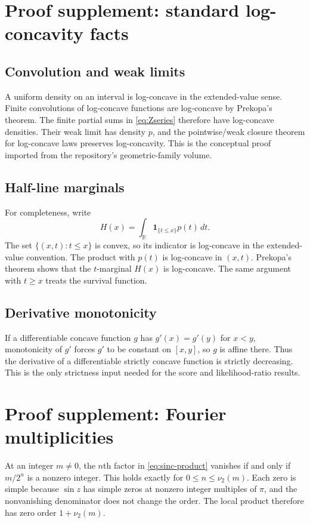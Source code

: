 \documentclass[11pt,oneside]{article}
\theoremstyle{definition}
\theoremstyle{remark}
\newcommand{\R}{\mathbb R}
\begin{document}
\appendix

\section{Proof supplement: standard log-concavity facts}

\subsection{Convolution and weak limits}
A uniform density on an interval is log-concave in the extended-value sense.
Finite convolutions of log-concave functions are log-concave by Prekopa's theorem.
The finite partial sums in \eqref{eq:Zseries} therefore have log-concave densities.
Their weak limit has density $p$, and the pointwise/weak closure theorem for
log-concave laws preserves log-concavity.  This is the conceptual proof imported
from the repository's geometric-family volume.

\subsection{Half-line marginals}
For completeness, write
\[
 H(x)=\int_{\R}\mathbf 1_{\{t\le x\}}p(t)\,dt.
\]
The set $\{(x,t):t\le x\}$ is convex, so its indicator is log-concave in the
extended-value convention.  The product with $p(t)$ is log-concave in $(x,t)$.
Prekopa's theorem shows that the $t$-marginal $H(x)$ is log-concave.  The same
argument with $t\ge x$ treats the survival function.

\subsection{Derivative monotonicity}
If a differentiable concave function $g$ has $g'(x)=g'(y)$ for $x<y$, monotonicity
of $g'$ forces $g'$ to be constant on $[x,y]$, so $g$ is affine there.  Thus the
derivative of a differentiable strictly concave function is strictly decreasing.
This is the only strictness input needed for the score and likelihood-ratio
results.

\section{Proof supplement: Fourier multiplicities}
At an integer $m\ne0$, the $n$th factor in \eqref{eq:sinc-product} vanishes if and
only if $m/2^n$ is a nonzero integer.  This holds exactly for
$0\le n\le\nu_2(m)$.  Each zero is simple because $\sin z$ has simple zeros at
nonzero integer multiples of $\pi$, and the nonvanishing denominator does not
change the order.  The local product therefore has zero order $1+\nu_2(m)$.
\end{document}
